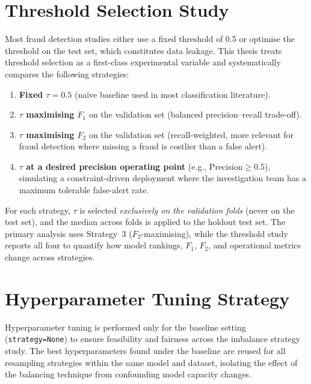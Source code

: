 \clearpage

\section{Threshold Selection Study}
\label{sec:threshold_study}

Most fraud detection studies either use a fixed threshold of 0.5 or optimise the threshold on the test set, which constitutes data leakage. This thesis treats threshold selection as a first-class experimental variable and systematically compares the following strategies:

\begin{enumerate}
  \item \textbf{Fixed $\tau = 0.5$} (na\"ive baseline used in most classification literature).
  \item \textbf{$\tau$ maximising $F_1$} on the validation set (balanced precision--recall trade-off).
  \item \textbf{$\tau$ maximising $F_2$} on the validation set (recall-weighted, more relevant for fraud detection where missing a fraud is costlier than a false alert).
  \item \textbf{$\tau$ at a desired precision operating point} (e.g., $\text{Precision} \geq 0.5$), simulating a constraint-driven deployment where the investigation team has a maximum tolerable false-alert rate.
\end{enumerate}

For each strategy, $\tau$ is selected \emph{exclusively on the validation folds} (never on the test set), and the median across folds is applied to the holdout test set. The primary analysis uses Strategy~3 ($F_2$-maximising), while the threshold study reports all four to quantify how model rankings, $F_1$, $F_2$, and operational metrics change across strategies.

\section{Hyperparameter Tuning Strategy}
\label{sec:tuning}

Hyperparameter tuning is performed only for the baseline setting (\texttt{strategy=None}) to ensure feasibility and fairness across the imbalance strategy study. The best hyperparameters found under the baseline are reused for all resampling strategies within the same model and dataset, isolating the effect of the balancing technique from confounding model capacity changes.

